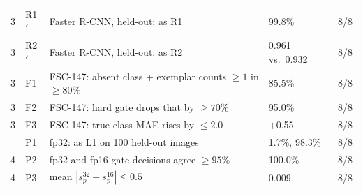 \begin{tabular*}{\textwidth}{@{\extracolsep{\fill}}cllll@{}}
3 & R1$'$ & Faster R-CNN, held-out: as R1 & 99.8\% & 8/8 \\
3 & R2$'$ & Faster R-CNN, held-out: as R2 & 0.961 vs.\ 0.932 & 8/8 \\
3 & F1 & FSC-147: absent class + exemplar counts $\geq 1$ in $\geq 80\%$ & 85.5\% & 8/8 \\
3 & F2 & FSC-147: hard gate drops that by $\geq 70\%$ & 95.0\% & 8/8 \\
3 & F3 & FSC-147: true-class MAE rises by $\leq 2.0$ & $+$0.55 & 8/8 \\
\addlinespace[2pt]
4 & P1 & fp32: as L1 on 100 held-out images & 1.7\%, 98.3\% & 8/8 \\
4 & P2 & fp32 and fp16 gate decisions agree $\geq 95\%$ & 100.0\% & 8/8 \\
4 & P3 & mean $|s_p^{32} - s_p^{16}| \leq 0.5$ & 0.009 & 8/8 \\
\bottomrule
\end{tabular*}

